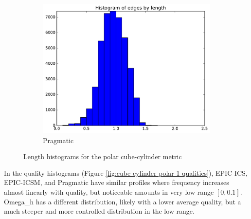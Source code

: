\documentclass[3p,times,procedia,number]{elsarticle}
\begin{document}
\begin{figure}
\begin{subfigure}{.4\textwidth}
\includegraphics[width=\textwidth]{pragmatic-cube-cylinder-polar-1-length.pdf}
\caption{Pragmatic}
\end{subfigure}
\caption{Length histograms for the polar cube-cylinder metric}
\label{fig:cube-cylinder-polar-1-lengths}
\end{figure}

In the quality histograms (Figure \ref{fig:cube-cylinder-polar-1-qualities}),
EPIC-ICS, EPIC-ICSM, and Pragmatic have similar
profiles where frequency increases almost linearly with quality, but noticeable
amounts in very low range $[0,0.1]$.
Omega\_h has a different distribution, likely with a lower average quality,
but a much steeper and more controlled distribution in the low range.
\end{document}
